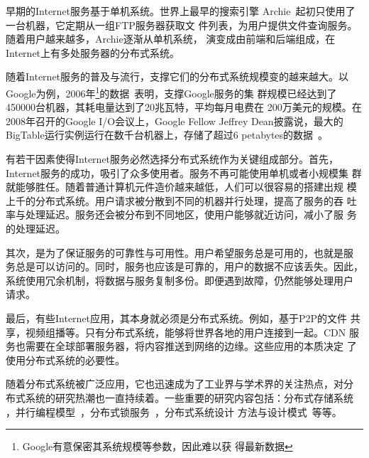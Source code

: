 早期的Internet服务基于单机系统。世界上最早的搜索引擎
Archie~\cite{archie}起初只使用了一台机器，它定期从一组FTP服务器获取文
件列表，为用户提供文件查询服务。随着用户越来越多，Archie逐渐从单机系统，
演变成由前端和后端组成，在Internet上有多处服务器的分布式系统。

随着Internet服务的普及与流行，支撑它们的分布式系统规模变的越来越大。以
Google为例，2006年\footnote{Google有意保密其系统规模等参数，因此难以获
得最新数据}的数据~\cite{how_google_works}表明，支撑Google服务的集
群规模已经达到了450000台机器，其耗电量达到了20兆瓦特，平均每月电费在
200万美元的规模。在2008年召开的Google I/O会议上，Google Fellow Jeffrey
Dean披露说，最大的BigTable运行实例运行在数千台机器上，存储了超过6
petabytes的数据~\cite{cnbeta_bigtable}。


有若干因素使得Internet服务必然选择分布式系统作为关键组成部分。首先，
Internet服务的成功，吸引了众多使用者。服务不再可能使用单机或者小规模集
群就能够胜任。随着普通计算机元件造价越来越低，人们可以很容易的搭建出规
模上千的分布式系统。用户请求被分散到不同的机器并行处理，提高了服务的吞
吐率与处理延迟。服务还会被分布到不同地区，使用户能够就近访问，减小了服
务的处理延迟。

其次，是为了保证服务的可靠性与可用性。用户希望服务总是可用的，也就是服
务总是可以访问的。同时，服务也应该是可靠的，用户的数据不应该丢失。因此，
系统使用冗余机制，将数据与服务复制多份。即便遇到故障，仍然能够处理用户
请求。

最后，有些Internet应用，其本身就必须是分布式系统。例如，基于P2P的文件
共享，视频组播等。只有分布式系统，能够将世界各地的用户连接到一起。CDN
服务也需要在全球部署服务器，将内容推送到网络的边缘。这些应用的本质决定
了使用分布式系统的必要性。


随着分布式系统被广泛应用，它也迅速成为了工业界与学术界的关注热点，对分
布式系统的研究热潮也一直持续着。一些重要的研究内容包括：分布式存储系统~
\cite{gfs, bigtable, dynamo, pacifica}，并行编程模型~\cite{mapreduce,
sawzall, dryad, dryadlinq}，分布式锁服务~\cite{chubby}，分布式系统设计
方法与设计模式~\cite{sinfonia, boxwood, seda, mace, macedon, p2}等等。



